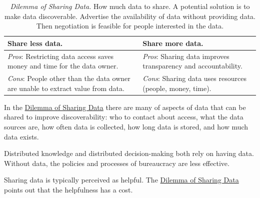 \begin{center}
\begin{table}[H] %
\begin{tabular}{ | m{\dilemmatablewidth}| m{\dilemmatablewidth} | } 
  \hline
  \textbf{Share less data.} &
  \textbf{Share more data.} \\
  \hline
  \textit{Pros}: Restricting data access saves money and time for the data owner.&
  \textit{Pros}: Sharing data improves transparency and accountability. \\
  \hline
  \textit{Cons}: People other than the data owner are unable to extract value from data. & 
  \textit{Cons}: Sharing data uses resources (people, money, time). \\
  \hline
\end{tabular}
\caption{
\textit{Dilemma of Sharing Data.}
How much data to share. A potential solution is to make data discoverable. Advertise the availability of data without providing data. Then negotiation is feasible for people interested in the data.
}
\label{table:dilemma-data-share-vs-hide}
\end{table}
\end{center}

In the \hyperref[table:dilemma-data-share-vs-hide]{Dilemma of Sharing Data} 
\iftoggle{printedonpaper}{ (\ref{table:dilemma-data-share-vs-hide})}{}%
there are many of aspects of data that can be 
shared to improve discoverability: who to contact about access, what the data sources are, how often data is collected, how long data is stored, and how much data exists.

Distributed knowledge and distributed decision-making both rely on having data. Without data, the policies and processes of bureaucracy are less effective. 

Sharing data is typically perceived as helpful. 
The \hyperref[table:dilemma-data-share-vs-hide]{Dilemma of Sharing Data} 
\iftoggle{printedonpaper}{ (\ref{table:dilemma-data-share-vs-hide})}{}%
points out that the helpfulness has a cost. 

